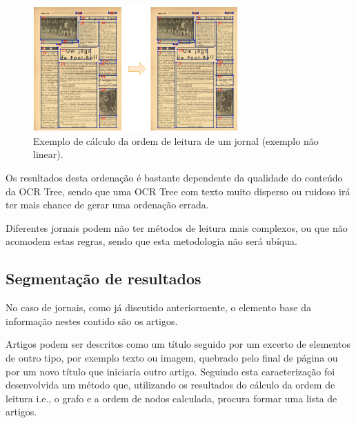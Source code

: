 \begin{figure}[H]
	\centering
	\includegraphics[width=0.7\textwidth]{images/ilustracoes/calculate_reading_order_example.png}
	\caption{Exemplo de cálculo da ordem de leitura de um jornal (exemplo não linear).}
	\label{fig:calculate_reading_order_example_example}
\end{figure}


Os resultados desta ordenação é bastante dependente da qualidade do conteúdo da OCR Tree, sendo que uma OCR Tree com texto muito disperso ou ruidoso irá ter mais chance de  gerar uma ordenação errada. 

Diferentes jornais podem não ter métodos de leitura mais complexos, ou que não acomodem estas regras, sendo que esta metodologia não será ubíqua. 



\subsection{Segmentação de resultados}
\label{contribution_result_segmentation}

No caso de jornais, como já discutido anteriormente, o elemento base da informação nestes contido são os artigos. 

Artigos podem ser descritos como um título seguido por um excerto de elementos de outro tipo, por exemplo texto ou imagem, quebrado pelo final de página ou por um novo título que iniciaria outro artigo. Seguindo esta caracterização foi desenvolvida um método que, utilizando os resultados do cálculo da ordem de leitura i.e., o grafo e a ordem de nodos calculada, procura formar uma lista de artigos.

